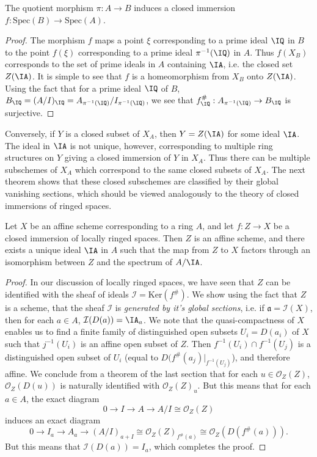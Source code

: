 \begin{lemma}
    The quotient morphism $\pi: A \to B$ induces a closed immersion $f: \text{Spec}(B) \to \text{Spec}(A)$.
\end{lemma}
\begin{proof}
    The morphism $f$ maps a point $\xi$ corresponding to a prime ideal $\IQ$ in $B$ to the point $f(\xi)$ corresponding to a prime ideal $\pi^{-1}(\IQ)$ in $A$. Thus $f(X_B)$ corresponds to the set of prime ideals in $A$ containing $\IA$, i.e. the closed set $Z(\IA)$. It is simple to see that $f$ is a homeomorphism from $X_B$ onto $Z(\IA)$. Using the fact that for a prime ideal $\IQ$ of $B$, $B_{\IQ} = (A/I)_{\IQ} = A_{\pi^{-1}(\IQ)} / I_{\pi^{-1}(\IQ)}$, we see that $f^\#_{\IQ}: A_{\pi^{-1}(\IQ)} \to B_{\IQ}$ is surjective.
\end{proof}

Conversely, if $Y$ is a closed subset of $X_A$, then $Y = Z(\IA)$ for some ideal $\IA$. The ideal in $\IA$ is not unique, however, corresponding to multiple ring structures on $Y$ giving a closed immersion of $Y$ in $X_A$. Thus there can be multiple subschemes of $X_A$ which correspond to the same closed subsets of $X_A$. The next theorem shows that these closed subschemes are classified by their global vanishing sections, which should be viewed analogously to the theory of closed immersions of ringed spaces.

\begin{theorem}
    Let $X$ be an affine scheme corresponding to a ring $A$, and let $f: Z \to X$ be a closed immersion of locally ringed spaces. Then $Z$ is an affine scheme, and there exists a unique ideal $\IA$ in $A$ such that the map from $Z$ to $X$ factors through an isomorphism between $Z$ and the spectrum of $A/\IA$.
\end{theorem}
\begin{proof}
    In our discussion of locally ringed spaces, we have seen that $Z$ can be identified with the sheaf of ideals $\mathcal{I} = \text{Ker}(f^\#)$. We show using the fact that $Z$ is a scheme, that the sheaf $\mathcal{I}$ is \emph{generated by it's global sections}, i.e. if $\mathfrak{a} = \mathcal{I}(X)$, then for each $a \in A$, $\mathcal{I}(D(a)) = \IA_a$. We note that the quasi-compactness of $X$ enables us to find a finite family of distinguished open subsets $U_i = D(a_i)$ of $X$ such that $j^{-1}(U_i)$ is an affine open subset of $Z$. Then $f^{-1}(U_i) \cap f^{-1}(U_j)$ is a distinguished open subset of $U_i$ (equal to $D(f^\#(a_j)|_{f^{-1}(U_j)}$), and therefore affine. We conclude from a theorem of the last section that for each $u \in \mathcal{O}_Z(Z)$, $\mathcal{O}_Z(D(u))$ is naturally identified with $\mathcal{O}_Z(Z)_u$. But this means that for each $a \in A$, the exact diagram
    \[ 0 \to I \to A \to A/I \cong \mathcal{O}_Z(Z) \]
    induces an exact diagram
    \[ 0 \to I_a \to A_a \to (A/I)_{a + I} \cong \mathcal{O}_Z(Z)_{f^\#(a)} \cong \mathcal{O}_Z(D(f^\#(a))). \]
    But this means that $\mathcal{I}(D(a)) = I_a$, which completes the proof.
\end{proof}

